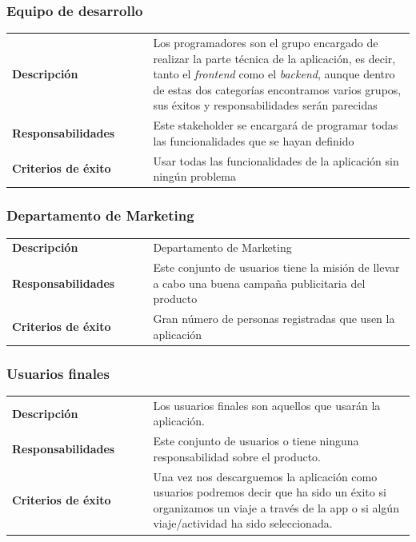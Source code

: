 \documentclass[11pt]{article}
\begin{document}
\subsubsection{Equipo de desarrollo}
\begin{table}[H]
  \centering
  \begin{tabular}{p{0.35\linewidth}|p{0.65\linewidth}}
    \toprule
    \textbf{Descripción} & Los programadores son el grupo encargado de realizar la parte técnica de la aplicación, es decir, tanto el \textit{frontend} como el \textit{backend}, aunque dentro de estas dos categorías encontramos varios grupos, sus éxitos y responsabilidades serán parecidas\\ 
    \textbf{Responsabilidades} & Este stakeholder se encargará de programar todas las funcionalidades que se hayan definido\\
    \textbf{Criterios de éxito} & Usar todas las funcionalidades de la aplicación sin ningún problema\\
    \bottomrule
  \end{tabular}
\end{table}

\subsubsection{Departamento de Marketing}
\begin{table}[H]
  \centering
  \begin{tabular}{p{0.35\linewidth}|p{0.65\linewidth}}
    \toprule
    \textbf{Descripción} & Departamento de Marketing\\ 
    \textbf{Responsabilidades} & Este conjunto de usuarios tiene la misión de llevar a cabo una buena campaña publicitaria del producto \\
    \textbf{Criterios de éxito} & Gran número de personas registradas que usen la aplicación\\
    \bottomrule
  \end{tabular}
\end{table}

\subsubsection{Usuarios finales}
\begin{table}[H]
  \centering
  \begin{tabular}{p{0.35\linewidth}|p{0.65\linewidth}}
    \toprule
    \textbf{Descripción} & Los usuarios finales son aquellos que usarán la aplicación.\\ 
    \textbf{Responsabilidades} & Este conjunto de usuarios o tiene ninguna responsabilidad sobre el producto. \\
    \textbf{Criterios de éxito} & Una vez nos descarguemos la aplicación como usuarios podremos decir que ha sido un éxito si organizamos un viaje a través de la app o si algún viaje/actividad ha sido seleccionada.\\
    \bottomrule
  \end{tabular}
\end{table}
\end{document}

